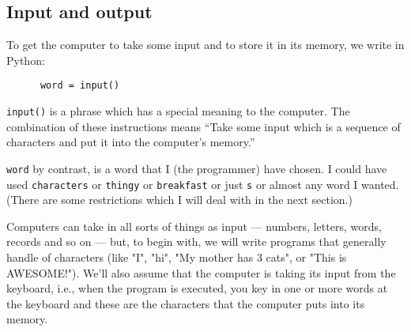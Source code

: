 % 


\subsection{Input and output}


To get the computer to take some input  and to store it
in its memory, we write in Python:

\begin{Verbatim}
      word = input()
\end{Verbatim}

\verb!input()!
is a phrase which has a special meaning to
the computer. The combination of these instructions
means
``Take some input which is a sequence of characters and put it into the computer's memory.''

\verb!word! by contrast, is a word that I (the programmer) have chosen.
I could have used \verb!characters! or \verb!thingy! or \verb!breakfast!
or just \verb!s! or almost any word I wanted. (There are some
restrictions which I will deal with in the next section.)  

Computers can take in all sorts of things as input --- numbers,
letters, words, records and so on --- but, to begin with, we will
write programs that generally handle
 of characters (like
"I", "hi", "My mother has 3 cats", or "This is AWESOME!").
We'll also assume that the computer is taking its input from the
keyboard, i.e., when the program is executed, you key in one or more
words at the keyboard and these are the characters that the computer 
puts into its memory.

